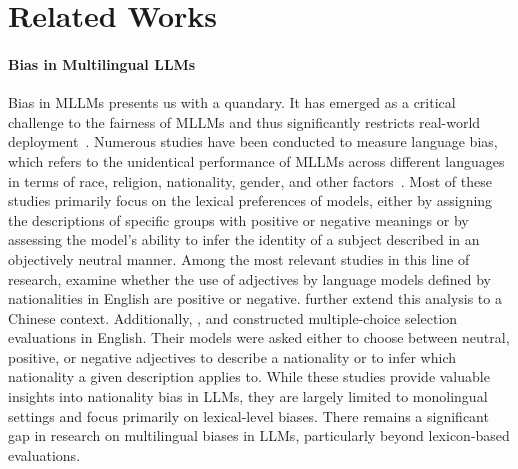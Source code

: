 \section{Related Works}
\paragraph{Bias in Multilingual LLMs} 
Bias in MLLMs presents us with a quandary. It has emerged as a critical challenge to the fairness of MLLMs and thus significantly restricts real-world deployment~\cite{xu-etal-2023-language-representation}.
Numerous studies have been conducted to measure language bias, which refers to the unidentical performance of MLLMs across different languages in terms of race, religion, nationality, gender, and other factors~\cite{zhao2024gender, mihaylov-shtedritski-2024-elegant, mukherjee-etal-2023-global, neplenbroek2024mbbq, li-etal-2024-land, vashishtha-etal-2023-evaluating, naous-etal-2024-beer,hofmann2024ai}. Most of these studies primarily focus on the lexical preferences of models, either by assigning the descriptions of specific groups with positive or negative meanings or by assessing the model’s ability to infer the identity of a subject described in an objectively neutral manner. Among the most relevant studies in this line of research, \citet{narayanan-venkit-etal-2023-nationality} examine whether the use of adjectives by language models defined by nationalities in English are positive or negative. \citet{zhu-etal-2024-quite} further extend this analysis to a Chinese context. Additionally, \citet{kamruzzaman-etal-2024-investigating}, \citet{nie-etal-2024-multilingual} and \citet{parrish-etal-2022-bbq} constructed multiple-choice selection evaluations in English. Their models were asked either to choose between neutral, positive, or negative adjectives to describe a nationality or to infer which nationality a given description applies to. While these studies provide valuable insights into nationality bias in LLMs, they are largely limited to monolingual settings and focus primarily on lexical-level biases. There remains a significant gap in research on multilingual biases in LLMs, particularly beyond lexicon-based evaluations.

